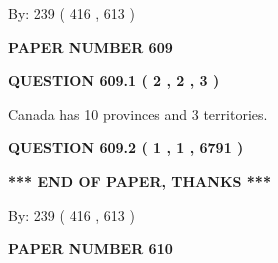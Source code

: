 \documentclass[12pt]{article}
\begin{document}
   
\hspace{1.0in} By: 
 239 ( 416 ,  613 )
   
   
   
   
\newpage 
\setcounter{page}{ 
   609001 } 
   
   
   
   
 {\textbf{ \Large{ PAPER NUMBER  609  }}}
   
   
\vspace{0.2in}
   
   
   
   
   
   
 \vspace{0.2in}
 
 
 
 
   
   
  
\vspace{0.2in}
  
{\textbf{\Large{QUESTION
609.1 
 ( 2 , 2 , 3 )
}}}
  
  
 
 
\noindent{}
 
 
Canada has 10  provinces and 3 territories.
 
 
 
 
  
\vspace{0.2in}
  
{\textbf{\Large{QUESTION
609.2 
 ( 1 , 1 , 6791 )
}}}
  
  
   
   
 \vspace{0.2in}
 
   
   
   
   
\vspace{1.0in} 
{\textbf{\large{ *** END OF PAPER, THANKS *** }}} 
   
   
\hspace{1.0in} By: 
 239 ( 416 ,  613 )
   
   
   
   
\newpage 
\setcounter{page}{ 
   610001 } 
   
   
   
   
 {\textbf{ \Large{ PAPER NUMBER  610  }}}
   
\end{document}
